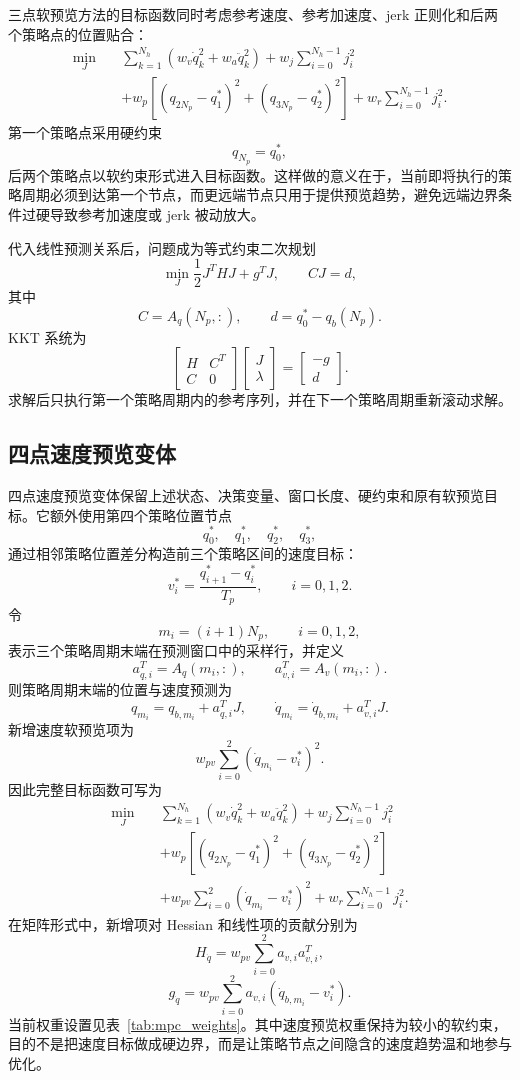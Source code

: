 \documentclass[12pt,a4paper]{ctexart}
\begin{document}
三点软预览方法的目标函数同时考虑参考速度、参考加速度、jerk 正则化和后两个策略点的位置贴合：
\[
\begin{aligned}
\min_J\quad
&\sum_{k=1}^{N_h}\left(w_v\dot q_k^2+w_a\ddot q_k^2\right)
 + w_j\sum_{i=0}^{N_h-1}j_i^2 \\
&+w_p\left[
(q_{2N_p}-q_1^\ast)^2+
(q_{3N_p}-q_2^\ast)^2
\right]
 +w_r\sum_{i=0}^{N_h-1}j_i^2 .
\end{aligned}
\]
第一个策略点采用硬约束
\[
    q_{N_p}=q_0^\ast,
\]
后两个策略点以软约束形式进入目标函数。这样做的意义在于，当前即将执行的策略周期必须到达第一个节点，而更远端节点只用于提供预览趋势，避免远端边界条件过硬导致参考加速度或 jerk 被动放大。

代入线性预测关系后，问题成为等式约束二次规划
\[
    \min_J \frac{1}{2}J^THJ+g^TJ,\qquad CJ=d,
\]
其中
\[
    C=A_q(N_p,:),\qquad d=q_0^\ast-q_b(N_p).
\]
KKT 系统为
\[
\begin{bmatrix}
H & C^T\\
C & 0
\end{bmatrix}
\begin{bmatrix}
J\\
\lambda
\end{bmatrix}
=
\begin{bmatrix}
-g\\
d
\end{bmatrix}.
\]
求解后只执行第一个策略周期内的参考序列，并在下一个策略周期重新滚动求解。

\subsection{四点速度预览变体}

四点速度预览变体保留上述状态、决策变量、窗口长度、硬约束和原有软预览目标。它额外使用第四个策略位置节点
\[
    q_0^\ast,\quad q_1^\ast,\quad q_2^\ast,\quad q_3^\ast,
\]
通过相邻策略位置差分构造前三个策略区间的速度目标：
\[
    v_i^\ast=\frac{q_{i+1}^\ast-q_i^\ast}{T_p},\qquad i=0,1,2.
\]
令
\[
    m_i=(i+1)N_p,\qquad i=0,1,2,
\]
表示三个策略周期末端在预测窗口中的采样行，并定义
\[
    a_{q,i}^T=A_q(m_i,:),\qquad a_{v,i}^T=A_v(m_i,:).
\]
则策略周期末端的位置与速度预测为
\[
    q_{m_i}=q_{b,m_i}+a_{q,i}^TJ,\qquad
    \dot q_{m_i}=\dot q_{b,m_i}+a_{v,i}^TJ .
\]
新增速度软预览项为
\[
    w_{pv}\sum_{i=0}^{2}\left(\dot q_{m_i}-v_i^\ast\right)^2 .
\]
因此完整目标函数可写为
\[
\begin{aligned}
\min_J\quad
&\sum_{k=1}^{N_h}\left(w_v\dot q_k^2+w_a\ddot q_k^2\right)
 +w_j\sum_{i=0}^{N_h-1}j_i^2\\
&+w_p\left[
\left(q_{2N_p}-q_1^\ast\right)^2+
\left(q_{3N_p}-q_2^\ast\right)^2
\right]\\
&+w_{pv}\sum_{i=0}^{2}
\left(\dot q_{m_i}-v_i^\ast\right)^2
 +w_r\sum_{i=0}^{N_h-1}j_i^2 .
\end{aligned}
\]
在矩阵形式中，新增项对 Hessian 和线性项的贡献分别为
\[
    H_{\dot q}=w_{pv}\sum_{i=0}^{2}a_{v,i}a_{v,i}^T,
\]
\[
    g_{\dot q}=w_{pv}\sum_{i=0}^{2}a_{v,i}
    \left(\dot q_{b,m_i}-v_i^\ast\right).
\]
当前权重设置见表~\ref{tab:mpc_weights}。其中速度预览权重保持为较小的软约束，目的不是把速度目标做成硬边界，而是让策略节点之间隐含的速度趋势温和地参与优化。
\end{document}
